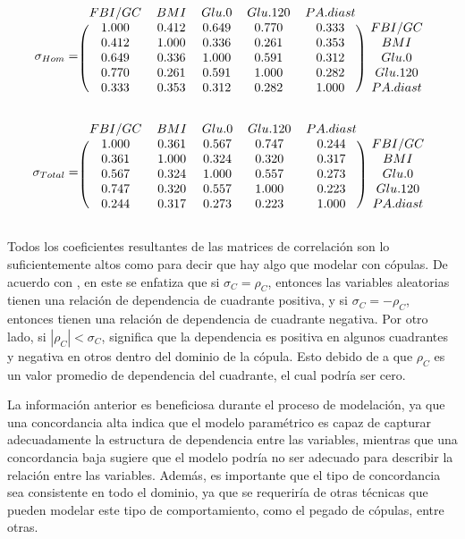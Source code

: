 \[
\sigma_{Hom} = \begin{blockarray}{cccccc}
FBI/GC      &      BMI      &    Glu.0      &  Glu.120      & PA.diast \\
\begin{block}{(ccccc)c}
1.000 & 0.412 & 0.649 & 0.770 & 0.333 & FBI/GC \\
0.412 & 1.000 & 0.336 & 0.261 & 0.353 & BMI \\
0.649 & 0.336 & 1.000 & 0.591 & 0.312 & Glu.0 \\
0.770 & 0.261 & 0.591 & 1.000 & 0.282 & Glu.120\\
0.333 & 0.353 & 0.312 & 0.282 & 1.000 & PA.diast \\
\end{block}
\end{blockarray}
 \]


\[
\sigma_{Total} = \begin{blockarray}{cccccc}
FBI/GC      &      BMI      &    Glu.0      &  Glu.120      & PA.diast \\
\begin{block}{(ccccc)c}
1.000 & 0.361 & 0.567 & 0.747 & 0.244 & FBI/GC \\
0.361 & 1.000 & 0.324 & 0.320 & 0.317 & BMI \\
0.567 & 0.324 & 1.000 & 0.557 & 0.273 & Glu.0 \\
0.747 & 0.320 & 0.557 & 1.000 & 0.223 & Glu.120 \\
0.244 & 0.317 & 0.273 & 0.223 & 1.000 & PA.diast \\
\end{block}
\end{blockarray}
 \]

Todos los coeficientes resultantes de las matrices de correlación son lo suficientemente altos como para decir que hay algo que modelar con cópulas. De acuerdo con \cite{Erdely2022}, en este se enfatiza que si $\sigma_{C} = \rho_{C}$, entonces las variables aleatorias tienen una relación de dependencia de cuadrante positiva, y si $\sigma_{C} = -\rho_{C}$, entonces tienen una relación de dependencia de cuadrante negativa. Por otro lado, si $ |\rho_C| < \sigma_C$, significa que la dependencia es positiva en algunos cuadrantes y negativa en otros dentro del dominio de la cópula. Esto debido de a que $\rho_{C}$ es un valor promedio de dependencia del cuadrante, el cual podría ser cero.


La información anterior es beneficiosa durante el proceso de modelación, ya que una concordancia alta indica que el modelo paramétrico es capaz de capturar adecuadamente la estructura de dependencia entre las variables, mientras que una concordancia baja sugiere que el modelo podría no ser adecuado para describir la relación entre las variables. Además, es importante que el tipo de concordancia sea consistente en todo el dominio, ya que se requeriría de otras técnicas que pueden modelar este tipo de comportamiento, como el pegado de cópulas, entre otras.

